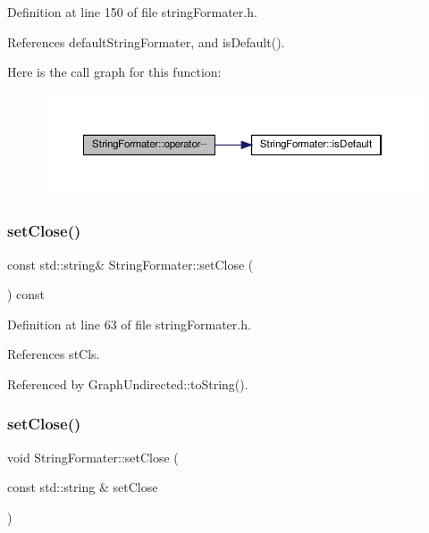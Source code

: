 Definition at line 150 of file string\+Formater.\+h.



References default\+String\+Formater, and is\+Default().

Here is the call graph for this function\+:
\nopagebreak
\begin{figure}[H]
\begin{center}
\leavevmode
\includegraphics[width=350pt]{classStringFormater_a2d42daa669ee9405b94b35ea121a9f95_cgraph}
\end{center}
\end{figure}
\mbox{\label{classStringFormater_abe673b8b8b9a588f05a8e7de748189e7}} 
\subsubsection{\texorpdfstring{set\+Close()}{setClose()}\hspace{0.1cm}{\footnotesize\ttfamily [1/2]}}
{\footnotesize\ttfamily const std\+::string\& String\+Formater\+::set\+Close (\begin{DoxyParamCaption}{ }\end{DoxyParamCaption}) const\hspace{0.3cm}{\ttfamily [inline]}}



Definition at line 63 of file string\+Formater.\+h.



References st\+Cls.



Referenced by Graph\+Undirected\+::to\+String().

\mbox{\label{classStringFormater_af8e955e219e2666e2072783bcfb54cc6}} 
\subsubsection{\texorpdfstring{set\+Close()}{setClose()}\hspace{0.1cm}{\footnotesize\ttfamily [2/2]}}
{\footnotesize\ttfamily void String\+Formater\+::set\+Close (\begin{DoxyParamCaption}\item[{const std\+::string \&}]{set\+Close }\end{DoxyParamCaption})\hspace{0.3cm}{\ttfamily [inline]}}



